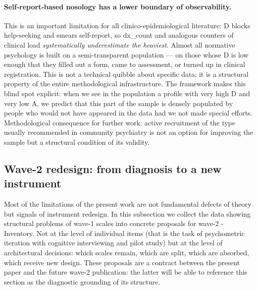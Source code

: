 \paragraph{Self-report-based nosology has a lower boundary of observability.} This is an important limitation for all clinico-epidemiological literature: D blocks help-seeking and smears self-report, so dx\_count and analogous counters of clinical load \emph{systematically underestimate the heaviest}. Almost all normative psychology is built on a semi-transparent population --- on those whose D is low enough that they filled out a form, came to assessment, or turned up in clinical registration. This is not a technical quibble about specific data; it is a structural property of the entire methodological infrastructure. The \DEIC{} framework makes this blind spot explicit: when we see in the population a profile with very high D and very low A, we predict that this part of the sample is densely populated by people who would not have appeared in the data had we not made special efforts. Methodological consequence for further work: active recruitment of the type usually recommended in community psychiatry is not an option for improving the sample but a structural condition of its validity.

\subsection{Wave-2 redesign: from diagnosis to a new instrument}
\label{subsec:wave2_design}

Most of the limitations of the present work are not fundamental defects of theory but signals of instrument redesign. In this subsection we collect the data showing structural problems of wave-1 scales into concrete proposals for wave-2 \DEIC{}-Inventory. Not at the level of individual items (that is the task of psychometric iteration with cognitive interviewing and pilot study) but at the level of architectural decisions: which scales remain, which are split, which are absorbed, which receive new design. These proposals are a contract between the present paper and the future wave-2 publication: the latter will be able to reference this section as the diagnostic grounding of its structure.

